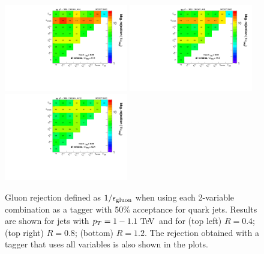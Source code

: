 
%
\begin{figure}
\centering
\includegraphics[width=0.48\textwidth]{./Figures/QGTagging/pT1000/AKtR04/effBkg2D.pdf}
\includegraphics[width=0.48\textwidth]{./Figures/QGTagging/pT1000/AKtR08/effBkg2D.pdf}
\includegraphics[width=0.48\textwidth]{./Figures/QGTagging/pT1000/AKtR12/effBkg2D.pdf}
\caption{Gluon rejection defined as $1/\epsilon_{\rm gluon}$ when using each 2-variable combination 
as a tagger with 50\% acceptance for quark jets. Results are shown for
jets with $\pt=1-1.1 \TeV$ and
for (top left) $R=0.4$; (top right) $R=0.8$; (bottom) $R=1.2$. The rejection obtained with a tagger that uses all variables is also shown
in the plots. }
\label{fig:qg_pt1000_comb}
\end{figure}
%

